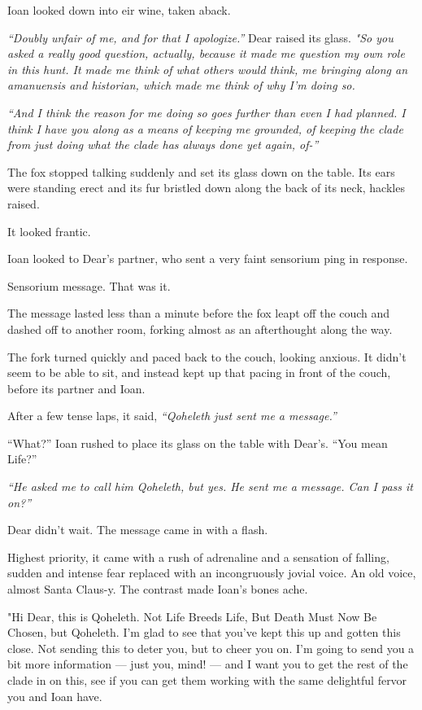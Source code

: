 Ioan looked down into eir wine, taken aback.

\emph{``Doubly unfair of me, and for that I apologize.''} Dear raised its glass. \emph{"So you asked a really good question, actually, because it made me question my own role in this hunt. It made me think of what others would think, me bringing along an amanuensis and historian, which made me think of why I'm doing so.}

\emph{``And I think the reason for me doing so goes further than even I had planned. I think I have you along as a means of keeping me grounded, of keeping the clade from just doing what the clade has always done yet again, of-''}

The fox stopped talking suddenly and set its glass down on the table. Its ears were standing erect and its fur bristled down along the back of its neck, hackles raised.

It looked frantic.

Ioan looked to Dear's partner, who sent a very faint sensorium ping in response.

Sensorium message. That was it.

The message lasted less than a minute before the fox leapt off the couch and dashed off to another room, forking almost as an afterthought along the way.

The fork turned quickly and paced back to the couch, looking anxious. It didn't seem to be able to sit, and instead kept up that pacing in front of the couch, before its partner and Ioan.

After a few tense laps, it said, \emph{``Qoheleth just sent me a message.''}

``What?'' Ioan rushed to place its glass on the table with Dear's. ``You mean Life?''

\emph{``He asked me to call him Qoheleth, but yes. He sent me a message. Can I pass it on?''}

Dear didn't wait. The message came in with a flash.

Highest priority, it came with a rush of adrenaline and a sensation of falling, sudden and intense fear replaced with an incongruously jovial voice. An old voice, almost Santa Claus-y. The contrast made Ioan's bones ache.

"Hi Dear, this is Qoheleth. Not Life Breeds Life, But Death Must Now Be Chosen, but Qoheleth. I'm glad to see that you've kept this up and gotten this close. Not sending this to deter you, but to cheer you on. I'm going to send you a bit more information — just you, mind! — and I want you to get the rest of the clade in on this, see if you can get them working with the same delightful fervor you and Ioan have.


